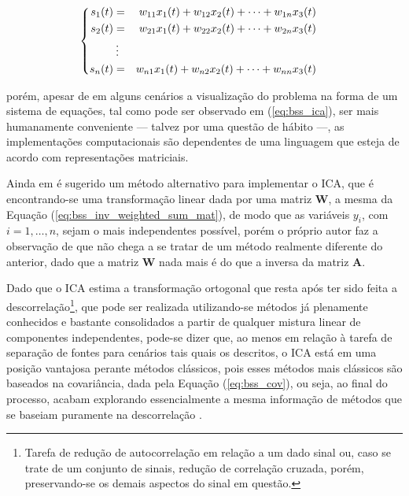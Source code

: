 \begin{equation}
\begin{cases}
\begin{aligned}
    s_{1}(t) & = & w_{11} x_{1}(t) +  w_{12} x_{2}(t) + \cdots + w_{1n} x_{3}(t) \\
    s_{2}(t) & = & w_{21} x_{1}(t) +  w_{22} x_{2}(t) + \cdots + w_{2n} x_{3}(t) \\
     & \hspace{0.08cm} \vdots & \\
    s_{n}(t) & = & w_{n1} x_{1}(t) +  w_{n2} x_{2}(t) + \cdots + w_{nn} x_{3}(t)
    \label{eq:bss_ica}
\end{aligned}
\end{cases}
\vspace{0.2cm}
\end{equation}

\noindent porém, apesar de em alguns cenários a visualização do problema na forma de um sistema de equações, tal como pode ser observado em (\ref{eq:bss_ica}), ser mais humanamente conveniente --- talvez por uma questão de hábito ---, as implementações computacionais são dependentes de uma linguagem que esteja de acordo com representações matriciais.

Ainda em \citep{hyvarinen2004independent} é sugerido um método alternativo para implementar o ICA, que é encontrando-se uma transformação linear dada por uma matriz $\mathbf{W}$, a mesma da Equação (\ref{eq:bss_inv_weighted_sum_mat}), de modo que as variáveis $y_{i}$, com $i=1,\dotsc,n$, sejam o mais independentes possível, porém o próprio autor faz a observação de que não chega a se tratar de um método realmente diferente do anterior, dado que a matriz $\mathbf{W}$ nada mais é do que a inversa da matriz $\mathbf{A}$.

Dado que o ICA estima a transformação ortogonal que resta após ter sido feita a descorrelação\footnote{Tarefa de redução de autocorrelação em relação a um dado sinal ou, caso se trate de um conjunto de sinais, redução de correlação cruzada, porém, preservando-se os demais aspectos do sinal em questão.}, que pode ser realizada utilizando-se métodos já plenamente conhecidos e bastante consolidados a partir de qualquer mistura linear de componentes independentes, pode-se dizer que, ao menos em relação à tarefa de separação de fontes para cenários tais quais os descritos, o ICA está em uma posição vantajosa perante métodos clássicos, pois esses métodos mais clássicos são baseados na covariância, dada pela Equação (\ref{eq:bss_cov}), ou seja, ao final do processo, acabam explorando essencialmente a mesma informação de métodos que se baseiam puramente na descorrelação \citep{hyvarinen2004independent}.\\

